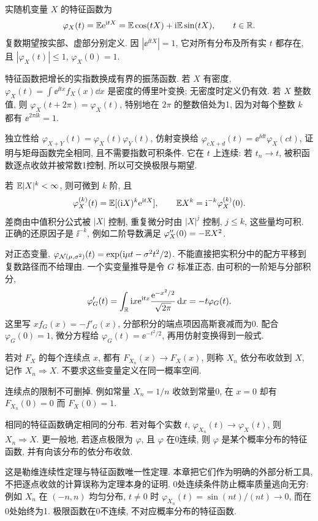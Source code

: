 \begin{definition}
实随机变量 $X$ 的特征函数为
\[\varphi_X(t)=\mathbb E\mathrm e^{\mathrm i tX}=\mathbb E\cos(tX)+\mathrm i\mathbb E\sin(tX),\qquad t\in\mathbb R.\]
复数期望按实部、虚部分别定义. 因 $|\ee^{\ii tX}|=1$, 它对所有分布及所有实 $t$ 都存在, 且 $|\varphi_X(t)|\le1$, $\varphi_X(0)=1$.
\end{definition}
特征函数把增长的实指数换成有界的振荡函数. 若 $X$ 有密度, $\varphi_X(t)=\int\ee^{\ii tx}f_X(x)\dd x$ 是密度的傅里叶变换; 无密度时定义仍有效. 若 $X$ 整数值, 则 $\varphi_X(t+2\pi)=\varphi_X(t)$, 特别地在 $2\pi$ 的整数倍处为1, 因为对每个整数 $k$ 都有 $\ee^{2\pi\ii k}=1$.

独立性给 $\varphi_{X+Y}(t)=\varphi_X(t)\varphi_Y(t)$, 仿射变换给 $\varphi_{cX+d}(t)=\ee^{\ii dt}\varphi_X(ct)$, 证明与矩母函数完全相同, 且不需要指数可积条件. 它在 $t$ 上连续: 若 $t_n\to t$, 被积函数逐点收敛并被常数1控制, 所以可交换极限与期望.

若 $\mathbb E|X|^k<\infty$, 则可微到 $k$ 阶, 且
\[\varphi_X^{(k)}(t)=\mathbb E[(\mathrm i X)^k\mathrm e^{\mathrm i tX}],\qquad
\mathbb E X^k=\mathrm i^{-k}\varphi_X^{(k)}(0).\]
差商由中值积分公式被 $|X|$ 控制, 重复微分时由 $|X|^j$ 控制, $j\le k$, 这些量均可积. 正确的还原因子是 $\ii^{-k}$, 例如二阶导数满足 $\varphi_X''(0)=-\mathbb E X^2$.

对正态变量, $\varphi_{\mathcal N(\mu,\sigma^2)}(t)=\exp(\mathrm i\mu t-\sigma^2t^2/2)$. 不能直接把实积分中的配方平移到复数路径而不给理由. 一个实变量推导是令 $G$ 标准正态, 由可积的一阶矩与分部积分,
\[
\varphi'_G(t)=\int_\mathbb R\mathrm i x\mathrm e^{\mathrm i tx}\frac{\mathrm e^{-x^2/2}}{\sqrt{2\pi}}\,\mathrm d x
=-t\varphi_G(t).
\]
这里写 $x f_G(x)=-f'_G(x)$, 分部积分的端点项因高斯衰减而为0. 配合 $\varphi_G(0)=1$, 微分方程给 $\varphi_G(t)=\ee^{-t^2/2}$, 再用仿射变换得到一般式.

\begin{definition}[依分布收敛]
若对 $F_X$ 的每个连续点 $x$, 都有 $F_{X_n}(x)\to F_X(x)$, 则称 $X_n$ 依分布收敛到 $X$, 记作 $X_n\Rightarrow X$. 不要求这些变量定义在同一概率空间.
\end{definition}
连续点的限制不可删掉. 例如常量 $X_n=1/n$ 收敛到常量0, 在 $x=0$ 却有 $F_{X_n}(0)=0$ 而 $F_X(0)=1$.
\begin{theorem}
相同的特征函数确定相同的分布. 若对每个实数 $t$, $\varphi_{X_n}(t)\to\varphi_X(t)$, 则 $X_n\Rightarrow X$. 更一般地, 若逐点极限为 $\varphi$, 且 $\varphi$ 在0连续, 则 $\varphi$ 是某个概率分布的特征函数, 并有向该分布的依分布收敛.
\end{theorem}
这是勒维连续性定理与特征函数唯一性定理. 本章把它们作为明确的外部分析工具, 不把逐点收敛的计算误称为定理本身的证明. 0处连续条件防止概率质量逃向无穷: 例如 $X_n$ 在 $(-n,n)$ 均匀分布, $t\ne0$ 时 $\varphi_{X_n}(t)=\sin(nt)/(nt)\to0$, 而在0处始终为1. 极限函数在0不连续, 不对应概率分布的特征函数.

